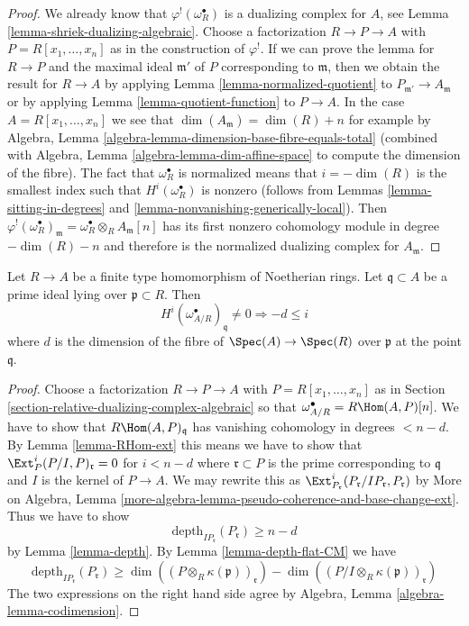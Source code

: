 \begin{proof}
We already know that $\varphi^!(\omega_R^\bullet)$ is a dualizing
complex for $A$, see Lemma \ref{lemma-shriek-dualizing-algebraic}.
Choose a factorization $R \to P \to A$ with $P = R[x_1, \ldots, x_n]$
as in the construction of $\varphi^!$. If we can prove the
lemma for $R \to P$ and the maximal ideal $\mathfrak m'$ of $P$ corresponding to
$\mathfrak m$, then we obtain the result for $R \to A$ by
applying Lemma \ref{lemma-normalized-quotient} to
$P_{\mathfrak m'} \to A_\mathfrak m$ or by applying
Lemma \ref{lemma-quotient-function} to $P \to A$.
In the case $A = R[x_1, \ldots, x_n]$ we see that
$\dim(A_\mathfrak m) = \dim(R) + n$ for example by
Algebra, Lemma \ref{algebra-lemma-dimension-base-fibre-equals-total}
(combined with Algebra, Lemma \ref{algebra-lemma-dim-affine-space}
to compute the dimension of the fibre).
The fact that $\omega_R^\bullet$ is normalized means
that $i = -\dim(R)$ is the smallest index such that
$H^i(\omega_R^\bullet)$ is nonzero (follows from
Lemmas \ref{lemma-sitting-in-degrees} and
\ref{lemma-nonvanishing-generically-local}).
Then $\varphi^!(\omega_R^\bullet)_\mathfrak m =
\omega_R^\bullet \otimes_R A_\mathfrak m[n]$
has its first nonzero cohomology module in degree $-\dim(R) - n$
and therefore is the normalized dualizing complex for $A_\mathfrak m$.
\end{proof}

\begin{lemma}
\label{lemma-relative-dualizing-trivial-vanishing}
Let $R \to A$ be a finite type homomorphism of Noetherian rings.
Let $\mathfrak q \subset A$ be a prime ideal lying over
$\mathfrak p \subset R$. Then
$$
H^i(\omega_{A/R}^\bullet)_\mathfrak q \not = 0
\Rightarrow - d \leq i
$$
where $d$ is the dimension of the fibre of $\Spec(A) \to \Spec(R)$
over $\mathfrak p$ at the point $\mathfrak q$.
\end{lemma}

\begin{proof}
Choose a factorization $R \to P \to A$ with $P = R[x_1, \ldots, x_n]$
as in Section \ref{section-relative-dualizing-complex-algebraic}
so that $\omega_{A/R}^\bullet = R\Hom(A, P)[n]$.
We have to show that $R\Hom(A, P)_\mathfrak q$
has vanishing cohomology in degrees $< n - d$.
By Lemma \ref{lemma-RHom-ext} this means we have to
show that $\Ext_P^i(P/I, P)_{\mathfrak r} = 0$ for $i < n - d$
where $\mathfrak r \subset P$ is the prime corresponding to $\mathfrak q$
and $I$ is the kernel of $P \to A$.
We may rewrite this as
$\Ext_{P_\mathfrak r}^i(P_\mathfrak r/IP_\mathfrak r, P_\mathfrak r)$
by More on Algebra, Lemma
\ref{more-algebra-lemma-pseudo-coherence-and-base-change-ext}.
Thus we have to show
$$
\text{depth}_{IP_\mathfrak r}(P_\mathfrak r) \geq n - d
$$
by Lemma \ref{lemma-depth}.
By Lemma \ref{lemma-depth-flat-CM} we have
$$
\text{depth}_{IP_\mathfrak r}(P_\mathfrak r) \geq
\dim((P \otimes_R \kappa(\mathfrak p))_\mathfrak r) -
\dim((P/I \otimes_R \kappa(\mathfrak p))_\mathfrak r)
$$
The two expressions on the right hand side agree by
Algebra, Lemma \ref{algebra-lemma-codimension}.
\end{proof}

